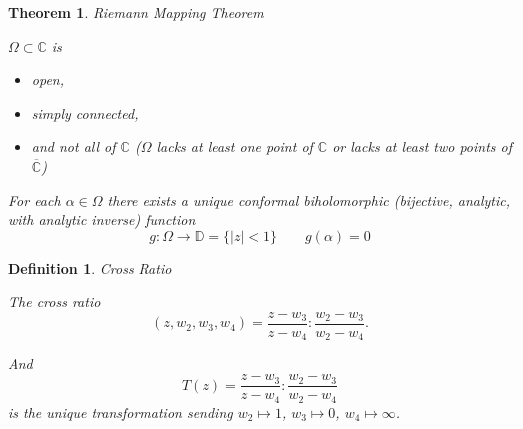 \documentclass[12pt]{Qual}
\newtheorem{theorem}{Theorem}
\newtheorem{definition}{Definition}
\begin{document}
\vspace{0.25cm}
\begin{theorem}{\Large\textit{Riemann Mapping Theorem}}

 $\Omega\subset\mathbb{C}$ is
\vspace{-0.25cm}
\begin{itemize}[leftmargin=2.5cm]
\setlength\itemsep{-0.1em}
\renewcommand\labelitemi{\faPuzzlePiece}
    \item open,
    \item simply connected,
    \item and not all of $\mathbb{C}$ ($\Omega$ lacks at least one point of $\mathbb{C}$ or lacks at least two points of $\overline{\mathbb{C}}$)
\end{itemize}
\vspace{-1cm}

 \begin{minipage}{0.85\textwidth}
\vspace{1.4cm}
For each $\alpha\in\Omega$ there exists a unique conformal biholomorphic (bijective, analytic, with analytic inverse) function $$g:\Omega\to\mathbb{D}=\{|z|<1\}\qquad g(\alpha)=0$$
\end{minipage}



\end{theorem}
\vspace{0.25cm}
\begin{definition}{\Large\textit{Cross Ratio}}

The cross ratio
$$(z,w_2,w_3,w_4)=\frac{z-w_3}{z-w_4}:\frac{w_2-w_3}{w_2-w_4}.$$

And
$$T(z)=\frac{z-w_3}{z-w_4}:\frac{w_2-w_3}{w_2-w_4}$$ is the unique transformation sending $w_2\mapsto 1$, $w_3\mapsto 0$, $w_4\mapsto\infty$.

\end{definition}
\end{document}
